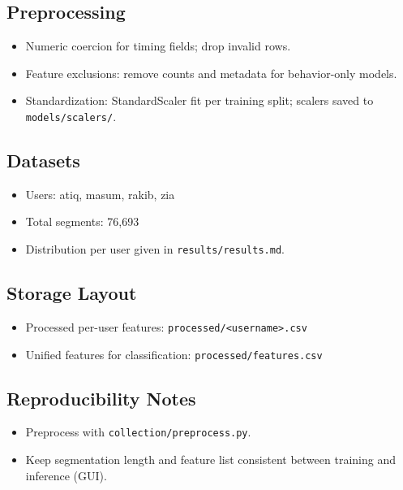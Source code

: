 \documentclass[
  12pt,
]{article}
\providecommand{\tightlist}{%
  \setlength{\itemsep}{0pt}\setlength{\parskip}{0pt}}
\begin{document}
\subsection{Preprocessing}\label{preprocessing}

\begin{itemize}
\tightlist
\item
  Numeric coercion for timing fields; drop invalid rows.
\item
  Feature exclusions: remove counts and metadata for behavior-only
  models.
\item
  Standardization: StandardScaler fit per training split; scalers saved
  to \texttt{models/scalers/}.
\end{itemize}

\subsection{Datasets}\label{datasets}

\begin{itemize}
\tightlist
\item
  Users: atiq, masum, rakib, zia
\item
  Total segments: 76,693
\item
  Distribution per user given in \texttt{results/results.md}.
\end{itemize}

\subsection{Storage Layout}\label{storage-layout}

\begin{itemize}
\tightlist
\item
  Processed per-user features:
  \texttt{processed/\textless{}username\textgreater{}.csv}
\item
  Unified features for classification: \texttt{processed/features.csv}
\end{itemize}

\subsection{Reproducibility Notes}\label{reproducibility-notes}

\begin{itemize}
\tightlist
\item
  Preprocess with \texttt{collection/preprocess.py}.
\item
  Keep segmentation length and feature list consistent between training
  and inference (GUI).
\end{itemize}
\end{document}
